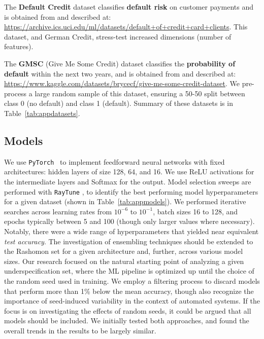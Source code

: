The \textbf{Default Credit} dataset \citep{yeh2009} classifies \textbf{default risk} on customer payments and is obtained from and described at: {\footnotesize\url{https://archive.ics.uci.edu/ml/datasets/default+of+credit+card+clients}}. This dataset, and German Credit, stress-test increased dimensions (number of features). 

The \textbf{GMSC} (Give Me Some Credit) dataset \citep{gmsc} classifies the \textbf{probability of default} within the next two years, and is obtained from and described at: {\footnotesize\url{https://www.kaggle.com/datasets/brycecf/give-me-some-credit-dataset}}. We pre-process a large random sample of this dataset, ensuring a 50-50 split between class 0 (no default) and class 1 (default). Summary of these datasets is in Table~\ref{tab:appdatasets}.

\subsection{Models}
\label{subapp:models}

We use \verb+PyTorch+~\citep{paszke2019} to implement feedforward neural networks with fixed architectures: hidden layers of size 128, 64, and 16. We use ReLU activations for the intermediate layers and Softmax for the output. Model selection sweeps are performed with \verb+RayTune+ \citep{liaw2018}, to identify the best performing model hyperparameters for a given dataset (shown in Table~\ref{tab:appmodels}). We performed iterative searches across learning rates from $10^{-6}$ to $10^{-1}$, batch sizes 16 to 128, and epochs typically between 5 and 100 (though only larger values where necessary). Notably, there were a wide range of hyperparameters that yielded near equivalent \textit{test accuracy}. The investigation of ensembling techniques should be extended to the Rashomon set for a given architecture and, further, across various model sizes. Our research focused on the natural starting point of analyzing a given underspecification set, where the ML pipeline is optimized up until the choice of the random seed used in training. We employ a filtering process to discard models that perform more than 1\% below the mean accuracy, though also recognize the importance of seed-induced variability in the context of automated systems. If the focus is on investigating the effects of random seeds, it could be argued that all models should be included. We initially tested both approaches, and found the overall trends in the results to be largely similar.

